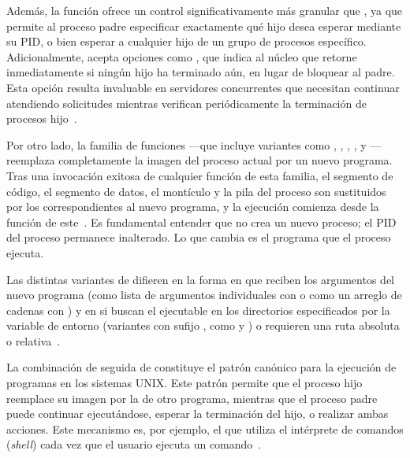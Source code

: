 Además, la función  ofrece un control significativamente más granular que , ya que permite al proceso padre especificar exactamente qué hijo desea esperar mediante su PID, o bien esperar a cualquier hijo de un grupo de procesos específico. Adicionalmente,  acepta opciones como , que indica al núcleo que retorne inmediatamente si ningún hijo ha terminado aún, en lugar de bloquear al padre. Esta opción resulta invaluable en servidores concurrentes que necesitan continuar atendiendo solicitudes mientras verifican periódicamente la terminación de procesos hijo~\cite{kerrisk2010}.


Por otro lado, la familia de funciones  ---que incluye variantes como , , , ,  y --- reemplaza completamente la imagen del proceso actual por un nuevo programa. Tras una invocación exitosa de cualquier función de esta familia, el segmento de código, el segmento de datos, el montículo y la pila del proceso son sustituidos por los correspondientes al nuevo programa, y la ejecución comienza desde la función  de este~\cite{stevens2013}. Es fundamental entender que  no crea un nuevo proceso; el PID del proceso permanece inalterado. Lo que cambia es el programa que el proceso ejecuta.

Las distintas variantes de  difieren en la forma en que reciben los argumentos del nuevo programa (como lista de argumentos individuales con  o como un arreglo de cadenas con ) y en si buscan el ejecutable en los directorios especificados por la variable de entorno  (variantes con sufijo , como  y ) o requieren una ruta absoluta o relativa~\cite{kerrisk2010}.

La combinación de  seguida de  constituye el patrón canónico para la ejecución de programas en los sistemas UNIX. Este patrón permite que el proceso hijo reemplace su imagen por la de otro programa, mientras que el proceso padre puede continuar ejecutándose, esperar la terminación del hijo, o realizar ambas acciones. Este mecanismo es, por ejemplo, el que utiliza el intérprete de comandos (\textit{shell}) cada vez que el usuario ejecuta un comando~\cite{tanenbaum2015}.


